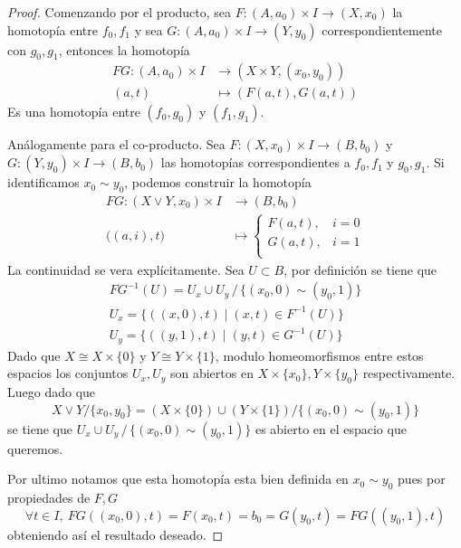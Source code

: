 \begin{proof}
Comenzando por el producto, sea \(F : (A,a_0) \times I \to (X,x_0)\) la homotopía
entre \(f_0 , f_1\) y sea \(G : (A,a_0) \times I \to (Y,y_0)\)
correspondientemente con \(g_0, g_1\), entonces la homotopía
\begin{align*}
  FG : (A,a_0) \times I &\to \left( X \times Y , (x_0, y_0) \right) \\
       (a, t) &\mapsto (F(a,t) , G(a,t))
\end{align*}
Es una homotopía entre \((f_0 , g_0)\) y \((f_1 , g_1)\).

Análogamente para el co-producto. Sea \(F : (X,x_0) \times I \to
(B,b_0)\) y \(G : (Y,y_0) \times I \to (B,b_0)\) las homotopías
correspondientes a \(f_0 , f_1\) y \(g_0
, g_1\). Si identificamos \(x_0 \sim y_0\), podemos construir la homotopía
\begin{align*}
  FG : \left( X \vee Y , x_0 \right) \times I &\to (B, b_0) \\
  \big((a,i) , t \big) &\mapsto
                \begin{cases}
                  F(a,t), & i = 0 \\
                  G(a,t), & i = 1 \\
                \end{cases}
\end{align*}
La continuidad se vera explícitamente. Sea \(U \subset B\), por definición
se tiene que
\begin{gather*}
  FG^{-1} \left( U \right) = U_x \cup U_y \, / \, \{(x_0,0) \sim (y_0, 1)\} \\
  U_x = \{ \left( (x,0), t \right) \mid (x,t) \in F^{-1} \left( U \right)\} \\
  U_y = \{ \left( (y,1), t \right) \mid (y,t) \in G^{-1} \left(U \right)\}
\end{gather*}
Dado que \(X \cong X \times \{0\}\) y \(Y \cong Y \times \{1\}\), modulo
homeomorfismos entre estos espacios los conjuntos \(U_x, U_y\) son
abiertos en \(X \times \{x_0\}, Y \times \{y_0\}\) respectivamente.
Luego dado que
\[ X \vee Y / \{ x_0 , y_0\} = \left( X \times \{0\} \right) \cup \left(
    Y \times \{1\} \right) / \{(x_0 , 0 ) \sim (y_0 , 1)\} \]
se tiene que \(U_x \cup U_y \, / \, \{ (x_0 , 0) \sim (y_0, 1)\}\) es
abierto en el espacio que queremos.

Por ultimo notamos que esta homotopía esta bien definida en \(x_0 \sim y_0\) pues por propiedades de \(F, G\)
\[
  \forall t \in I,\ FG \left( (x_0,0) , t \right) = F (x_0, t) = b_0 =
  G(y_0, t) = FG \left( (y_0,1), t \right)
\]
obteniendo así el resultado deseado.
\end{proof}

